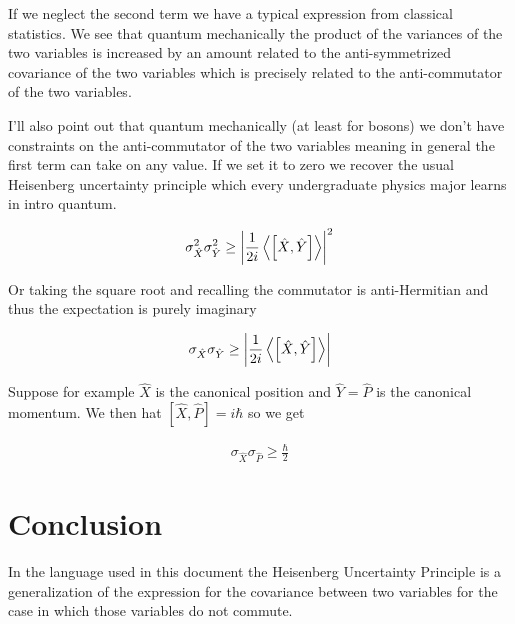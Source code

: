 \documentclass[12pt]{article}
\begin{document}
If we neglect the second term we have a typical expression from classical statistics. We see that quantum mechanically the product of the variances of the two variables is increased by an amount related to the anti-symmetrized covariance of the two variables which is precisely related to the anti-commutator of the two variables. 

I'll also point out that quantum mechanically (at least for bosons) we don't have constraints on the anti-commutator of the two variables meaning in general the first term can take on any value. If we set it to zero we recover the usual Heisenberg uncertainty principle which every undergraduate physics major learns in intro quantum.

\begin{align}
\sigma_{\hat{X}}^2\sigma_{\hat{Y}}^2 \ge \left\lvert \frac{1}{2i} \Braket{\left[\hat{X},\hat{Y}\right]}\right\rvert^2
\end{align}

Or taking the square root and recalling the commutator is anti-Hermitian and thus the expectation is purely imaginary

\begin{align}
\sigma_{\hat{X}}\sigma_{\hat{Y}} \ge \left\lvert\frac{1}{2i} \Braket{\left[\hat{X},\hat{Y}\right]} \right\rvert
\end{align}

Suppose for example $\hat{X}$ is the canonical position and $\hat{Y} = \hat{P}$ is the canonical momentum. We then hat $\left[\hat{X},\hat{P}\right] = i\hbar$ so we get

\begin{align}
\sigma_{\hat{X}}\sigma_{\hat{P}} \ge \frac{\hbar}{2}
\end{align}

\section{Conclusion}
In the language used in this document the Heisenberg Uncertainty Principle is a generalization of the expression for the covariance between two variables for the case in which those variables do not commute.
\end{document}

